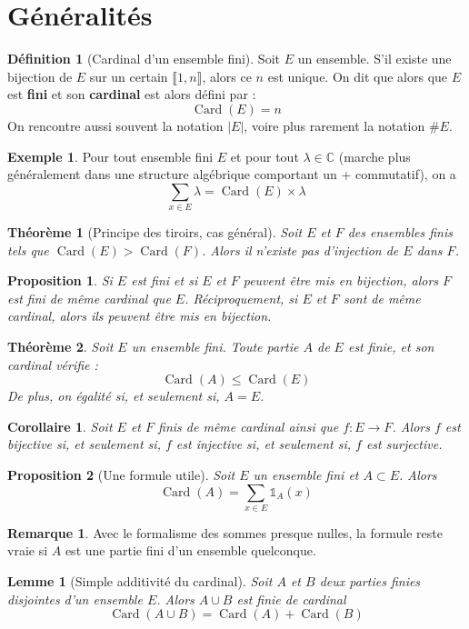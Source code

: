 \documentclass[french]{book}
\newcommand{\C}{\mathbb{C}}
\theoremstyle{plain}
\newtheorem{thm}{Théorème}[chapter]
\newtheorem{lem}{Lemme}[chapter]
\newtheorem{prop}{Proposition}[chapter]
\newtheorem{cor}{Corollaire}[chapter]
\theoremstyle{definition}
\newtheorem{dfn}{Définition}[chapter]
\newtheorem{exa}{Exemple}[chapter]
\newtheorem{rmq}{Remarque}[chapter]
\theoremstyle{remark}
\DeclareMathOperator{\card}{Card}
\begin{document}
\section{Généralités}
\begin{dfn}[Cardinal d'un ensemble fini]
	Soit $E$ un ensemble. S'il existe une bijection de $E$ sur un certain $\llbracket1,n\rrbracket$, alors ce $n$ est unique. On dit que alors que $E$ est \textbf{fini} et son \textbf{cardinal} est alors défini par :
	$$\card(E)=n$$ On rencontre aussi souvent la notation $\left\lvert E\right\rvert$, voire plus rarement la notation $\#E$.
\end{dfn}
\begin{exa}
	Pour tout ensemble fini $E$ et pour tout $\lambda\in\C$ (marche plus généralement dans une structure algébrique comportant un + commutatif), on a $$\sum_{x\in E}\lambda = \card(E)\times\lambda$$
\end{exa}
\begin{thm}[Principe des tiroirs, cas général]
	Soit $E$ et $F$ des ensembles finis tels que $\card(E)>\card(F)$. Alors il n'existe pas d'injection de $E$ dans $F$.
\end{thm}
\begin{prop}
	Si $E$ est fini et si $E$ et $F$ peuvent être mis en bijection, alors $F$ est fini de même cardinal que $E$. Réciproquement, si $E$ et $F$ sont de même cardinal, alors ils peuvent être mis en bijection.
\end{prop}
\begin{thm}
	Soit $E$ un ensemble fini. Toute partie $A$ de $E$ est finie, et son cardinal vérifie : $$\card(A)\leqslant\card(E)$$ De plus, on égalité si, et seulement si, $A=E$.
\end{thm}
\begin{cor}
	Soit $E$ et $F$ finis de même cardinal ainsi que $f:E\rightarrow F$. Alors $f$ est bijective si, et seulement si, $f$ est injective si, et seulement si, $f$ est surjective.
\end{cor}
\begin{prop}[Une formule utile]
	Soit $E$ un ensemble fini et $A\subset E$. Alors $$\card(A)=\sum_{x\in E} \mathds{1}_A(x)$$
\end{prop}
\begin{rmq} Avec le formalisme des sommes presque nulles, la formule reste vraie si $A$ est une partie fini d'un ensemble quelconque. \end{rmq}
\begin{lem}[Simple additivité du cardinal]
	Soit $A$ et $B$ deux parties finies disjointes d'un ensemble $E$. Alors $A\cup B$ est finie de cardinal $$\card(A\cup B)=\card(A)+\card(B)$$
\end{lem}
\end{document}
